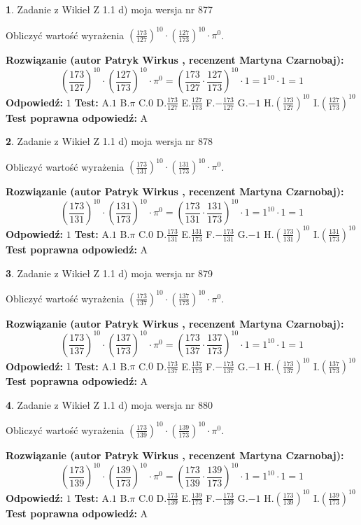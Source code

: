 \documentclass[12pt, a4paper]{article}
\theoremstyle{definition} %
\newtheorem{zad}{}
\newcommand{\zadStart}[1]{\begin{zad}#1\newline}
\newcommand{\zadStop}{\end{zad}}
\newcommand{\rozwStart}[2]{\noindent \textbf{Rozwiązanie (autor #1 , recenzent #2): }\newline}
\newcommand{\rozwStop}{\newline}
\newcommand{\odpStart}{\noindent \textbf{Odpowiedź:}\newline}
\newcommand{\odpStop}{\newline}
\newcommand{\testStart}{\noindent \textbf{Test:}\newline}
\newcommand{\testStop}{\newline}
\newcommand{\kluczStart}{\noindent \textbf{Test poprawna odpowiedź:}\newline}
\newcommand{\kluczStop}{\newline}
\begin{document}
\zadStart{Zadanie z Wikieł Z 1.1 d) moja wersja nr 877}

Obliczyć wartość wyrażenia $(\frac{173}{127})^{10} \cdot (\frac{127}{173})^{10} \cdot \pi^{0}$.
\zadStop
\rozwStart{Patryk Wirkus}{Martyna Czarnobaj}
$$(\frac{173}{127})^{10} \cdot (\frac{127}{173})^{10} \cdot \pi^{0} = (\frac{173}{127} \cdot \frac{127}{173})^{10} \cdot 1 = 1^{10} \cdot 1 = 1$$
\rozwStop
\odpStart
$1$
\odpStop
\testStart
A.$1$ B.$\pi$ C.$0$ D.$\frac{173}{127}$ E.$\frac{127}{173}$
F.$-\frac{173}{127}$ G.$-1$
H.$(\frac{173}{127})^{10}$
I.$(\frac{127}{173})^{10}$
\testStop
\kluczStart
A
\kluczStop



\zadStart{Zadanie z Wikieł Z 1.1 d) moja wersja nr 878}

Obliczyć wartość wyrażenia $(\frac{173}{131})^{10} \cdot (\frac{131}{173})^{10} \cdot \pi^{0}$.
\zadStop
\rozwStart{Patryk Wirkus}{Martyna Czarnobaj}
$$(\frac{173}{131})^{10} \cdot (\frac{131}{173})^{10} \cdot \pi^{0} = (\frac{173}{131} \cdot \frac{131}{173})^{10} \cdot 1 = 1^{10} \cdot 1 = 1$$
\rozwStop
\odpStart
$1$
\odpStop
\testStart
A.$1$ B.$\pi$ C.$0$ D.$\frac{173}{131}$ E.$\frac{131}{173}$
F.$-\frac{173}{131}$ G.$-1$
H.$(\frac{173}{131})^{10}$
I.$(\frac{131}{173})^{10}$
\testStop
\kluczStart
A
\kluczStop



\zadStart{Zadanie z Wikieł Z 1.1 d) moja wersja nr 879}

Obliczyć wartość wyrażenia $(\frac{173}{137})^{10} \cdot (\frac{137}{173})^{10} \cdot \pi^{0}$.
\zadStop
\rozwStart{Patryk Wirkus}{Martyna Czarnobaj}
$$(\frac{173}{137})^{10} \cdot (\frac{137}{173})^{10} \cdot \pi^{0} = (\frac{173}{137} \cdot \frac{137}{173})^{10} \cdot 1 = 1^{10} \cdot 1 = 1$$
\rozwStop
\odpStart
$1$
\odpStop
\testStart
A.$1$ B.$\pi$ C.$0$ D.$\frac{173}{137}$ E.$\frac{137}{173}$
F.$-\frac{173}{137}$ G.$-1$
H.$(\frac{173}{137})^{10}$
I.$(\frac{137}{173})^{10}$
\testStop
\kluczStart
A
\kluczStop



\zadStart{Zadanie z Wikieł Z 1.1 d) moja wersja nr 880}

Obliczyć wartość wyrażenia $(\frac{173}{139})^{10} \cdot (\frac{139}{173})^{10} \cdot \pi^{0}$.
\zadStop
\rozwStart{Patryk Wirkus}{Martyna Czarnobaj}
$$(\frac{173}{139})^{10} \cdot (\frac{139}{173})^{10} \cdot \pi^{0} = (\frac{173}{139} \cdot \frac{139}{173})^{10} \cdot 1 = 1^{10} \cdot 1 = 1$$
\rozwStop
\odpStart
$1$
\odpStop
\testStart
A.$1$ B.$\pi$ C.$0$ D.$\frac{173}{139}$ E.$\frac{139}{173}$
F.$-\frac{173}{139}$ G.$-1$
H.$(\frac{173}{139})^{10}$
I.$(\frac{139}{173})^{10}$
\testStop
\kluczStart
A
\kluczStop
\end{document}

